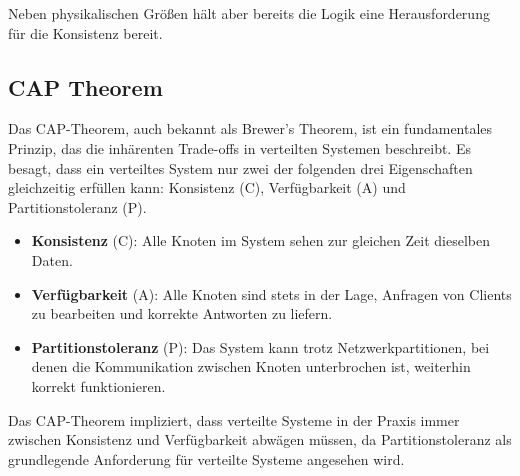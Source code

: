 \documentclass[../vs-script-first-v01.tex]{subfiles}
\begin{document}
Neben physikalischen Größen hält aber bereits die Logik eine Herausforderung für die Konsistenz  bereit. 

\subsection{CAP Theorem}
Das CAP-Theorem, auch bekannt als Brewer's Theorem, ist ein fundamentales Prinzip, das die inhärenten Trade-offs in verteilten Systemen beschreibt. Es besagt, dass ein verteiltes System nur zwei der folgenden drei Eigenschaften gleichzeitig erfüllen kann: Konsistenz (C), Verfügbarkeit (A) und Partitionstoleranz (P).
\begin{itemize}
\item \textbf{Konsistenz} (C): Alle Knoten im System sehen zur gleichen Zeit dieselben Daten.
\item \textbf{Verfügbarkeit} (A): Alle Knoten sind stets in der Lage, Anfragen von Clients zu bearbeiten und korrekte Antworten zu liefern.
\item \textbf{Partitionstoleranz} (P): Das System kann trotz Netzwerkpartitionen, bei denen die Kommunikation zwischen Knoten unterbrochen ist, weiterhin korrekt funktionieren.
\end{itemize}

Das CAP-Theorem impliziert, dass verteilte Systeme in der Praxis immer zwischen Konsistenz und Verfügbarkeit abwägen müssen, da Partitionstoleranz als grundlegende Anforderung für verteilte Systeme angesehen wird.
\end{document}
